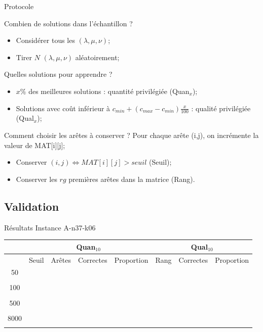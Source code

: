\documentclass{beamer}
\begin{document}
\begin{frame}{Protocole}

\begin{block}{Combien de solutions dans l'échantillon ?}
\begin{itemize}
\item Considérer tous les $(\lambda,\mu,\nu)$;
\item Tirer $N$ $(\lambda,\mu,\nu)$ aléatoirement;
\end{itemize}
\end{block}

\begin{block}{Quelles solutions pour apprendre ?}
\begin{itemize}
\item $x\%$ des meilleures solutions : quantité privilégiée (Quan$_{x}$);
\item Solutions avec coût inférieur à $c_{min} + (c_{max}-c_{min})\frac{x}{100}$ : qualité privilégiée (Qual$_{x}$);
\end{itemize}
\end{block}

\begin{block}{Comment choisir les arêtes à conserver ?}
Pour chaque arête (i,j), on incrémente la valeur de MAT[i][j];
\begin{itemize}
\item Conserver $(i,j) \Leftrightarrow MAT[i][j] > seuil$ (Seuil);
\item Conserver les $rg$ premières arêtes dans la matrice (Rang).
\end{itemize}
\end{block}


\end{frame}

\subsection{Validation}
\begin{frame}{Résultats}
Instance A-n37-k06
\begin{table}[H]


\begin{tabular}{|c|c|c|c|c|c|c|c|}
\hline
 & \multicolumn{4}{c|}{Quan$_{10}$} & \multicolumn{3}{c|}{Qual$_{10}$} \\
 \hline
 & Seuil & Arêtes & Correctes & Proportion & Rang & Correctes & Proportion \\
 \hline
 50 & & & & & & & \\
 \cline{2-8} 
    & & & & & & & \\
  \hline
   100 & & & & & & & \\
 \cline{2-8} 
    & & & & & & & \\
  \hline
   500 & & & & & & & \\
 \cline{2-8} 
    & & & & & & & \\
  \hline
   8000 & & & & & & & \\
 \cline{2-8} 
    & & & & & & & \\
  \hline

\end{tabular}
\end{table}
\end{frame}
\end{document}

